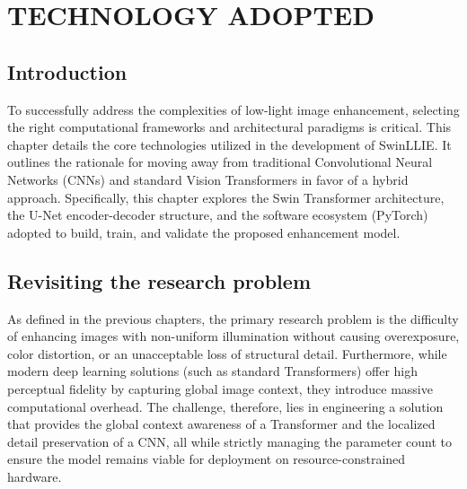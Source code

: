 \documentclass[12pt, a4paper]{report}
\begin{document}
\chapter{TECHNOLOGY ADOPTED}
\section{Introduction}
To successfully address the complexities of low-light image enhancement, selecting the right computational frameworks and architectural paradigms is critical. This chapter details the core technologies utilized in the development of SwinLLIE. It outlines the rationale for moving away from traditional Convolutional Neural Networks (CNNs) and standard Vision Transformers in favor of a hybrid approach. Specifically, this chapter explores the Swin Transformer architecture, the U-Net encoder-decoder structure, and the software ecosystem (PyTorch) adopted to build, train, and validate the proposed enhancement model.

\section{Revisiting the research problem}
As defined in the previous chapters, the primary research problem is the difficulty of enhancing images with non-uniform illumination without causing overexposure, color distortion, or an unacceptable loss of structural detail. Furthermore, while modern deep learning solutions (such as standard Transformers) offer high perceptual fidelity by capturing global image context, they introduce massive computational overhead. The challenge, therefore, lies in engineering a solution that provides the global context awareness of a Transformer and the localized detail preservation of a CNN, all while strictly managing the parameter count to ensure the model remains viable for deployment on resource-constrained hardware.
\end{document}
